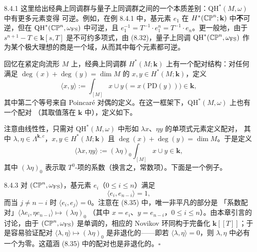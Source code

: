 \begin{wrem}{8.4.1}
  这里给出经典上同调群与量子上同调群之间的一个本质差别：$\mathrm{QH}^*(M,\omega)$ 中有更多元素变得
  可逆。例如，在例 8.4.1 中，基元素 $e_1$ 在 $H^*(\mathbb{CP}^n;\mathbf{k})$ 中\textbf{不}可逆，但在
  $\mathrm{QH}^*(\mathbb{CP}^n,\omega_{\mathrm{FS}})$ 中可逆，且
  $e_1^{-1}=T^{-1}\cdot e_1^n=T^{-1}\cdot e_n$。更一般地，由于
  $s^{n+1}-T\in\mathbf{k}[s,T]$ 是不可约多项式，由 (8.32)，量子上同调
  $\mathrm{QH}^*(\mathbb{CP}^n,\omega_{\mathrm{FS}})$ 作为某个极大理想的商是一个域，从而其中每个元素都可逆。
\end{wrem}

回忆在紧定向流形 $M$ 上，经典上同调群 $H^*(M;\mathbf{k})$ 上有一个配对结构：对任何满足
$\deg(x)+\deg(y)=\dim M$ 的 $x,y\in H^*(M;\mathbf{k})$，定义
\begin{equation}\tag{8.34}
  \langle x,y\rangle:=\int_{[M]}x\cup y\ \bigl(=x(\mathrm{PD}(y))\bigr)\in\mathbf{k},
\end{equation}
其中第二个等号来自 Poincaré 对偶的定义。在这一框架下，$\mathrm{QH}^*(M,\omega)$ 上也有一个配对
（其取值落在 $\mathbf{k}$ 中），定义如下。

注意由线性性，只需对 $\mathrm{QH}^*(M,\omega)$ 中形如 $\lambda x$、$\eta y$ 的单项式元素定义配对，
其中 $\lambda,\eta\in\Lambda^{\mathbf{k},c}$，$x,y\in H^*(M;\mathbf{k})$ 且
$\deg(x)+\deg(y)=\dim M$。于是定义
\begin{equation}\tag{8.35}
  \langle\lambda x,\eta y\rangle
    :=(\lambda\eta)_0\int_{[M]}x\cup y\in\mathbf{k},
\end{equation}
其中 $(\lambda\eta)_0$ 表示取 $T^0$-项的系数（换言之，常数项）。下面是一个例子。

\begin{wexam}{8.4.3}
  对 $(\mathbb{CP}^n,\omega_{\mathrm{FS}})$，基元素 $e_i$（$0\leqslant i\leqslant n$）满足
  \[
    \langle e_i,e_{n-i}\rangle=1,
  \]
  而当 $j\ne n-i$ 时 $\langle e_i,e_j\rangle=0$。注意在 (8.35) 中，唯一非平凡的部分是
  「系数配对」$\langle\lambda e_i,\eta e_{n-i}\rangle\mapsto(\lambda\eta)_0$
  （其中 $x=e_i$、$y=e_{n-i}$，$0\leqslant i\leqslant n$）。由本章引言的讨论，由于
  $(\mathbb{CP}^n,\omega_{\mathrm{FS}})$ 是单调的，相应的 Novikov 环同构于完备化
  $\mathbf{k}[\![T]\!]$；于是容易验证配对 $\langle\lambda,\eta\rangle\mapsto(\lambda\eta)_0$
  是非退化的——即若 $\langle\lambda,\eta\rangle=0$，则 $\lambda,\eta$ 中必有一个为零。这蕴涵
  (8.35) 中的配对也是非退化的。\hfill$\square$
\end{wexam}

